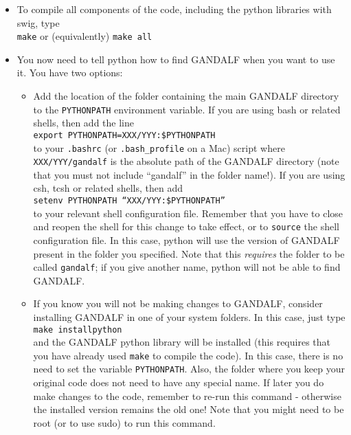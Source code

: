\documentclass[a4paper]{article}
\newcommand{\var}[1]{\texttt{#1}}
\begin{document}
\begin{itemize}
\item To compile all components of the code, including the python libraries with swig, type \\
\newline
\noindent \var{make} or (equivalently) \var{make all}\\

\item You now need to tell python how to find GANDALF when you want to use it. You have two options:
\begin{itemize}
\item Add the location of the folder containing the main GANDALF directory to the \var{PYTHONPATH} environment variable.  If you are using bash or related shells, then add the line \\
\newline
\noindent \var{export PYTHONPATH=XXX/YYY:\$PYTHONPATH} \\

\noindent to your \var{.bashrc} (or \var{.bash\_profile} on a Mac) script where \var{XXX/YYY/gandalf} is the absolute path of the GANDALF directory (note that you must not include ``gandalf'' in the folder name!). If you are using csh, tcsh or related shells, then add \\
\newline
\noindent \var{setenv PYTHONPATH ``XXX/YYY:\$PYTHONPATH''} \\

\noindent to your relevant shell configuration file. Remember that you have to close and reopen the shell for this change to take effect, or to \var{source} the shell configuration file. In this case, python will use the version of GANDALF present in the folder you specified. Note that this \textit{requires} the folder to be called \var{gandalf}; if you give another name, python will not be able to find GANDALF.

\item If you know you will not be making changes to GANDALF, consider installing GANDALF in one of your system folders. In this case, just type \\
\newline
\var{make installpython}
\\

\noindent and the GANDALF python library will be installed (this requires that you have already used \var{make} to compile the code). In this case, there is no need to set the variable \var{PYTHONPATH}. Also, the folder where you keep your original code does not need to have any special name. If later you do make changes to the code, remember to re-run this command - otherwise the installed version remains the old one! Note that you might need to be root (or to use sudo) to run this command.

\end{itemize}

\end{itemize}
\end{document}

